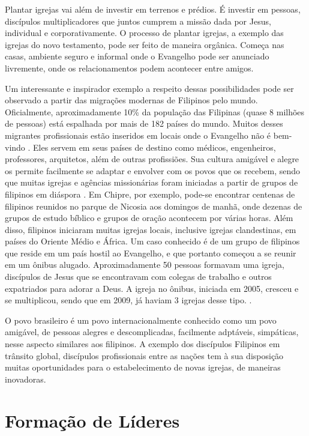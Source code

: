 \documentclass[12pt,openright,oneside,a4paper,
english,french,spanish,brazil]{abntex2}
\begin{document}
Plantar igrejas vai além de investir em terrenos e prédios. É investir em pessoas, discípulos multiplicadores que juntos cumprem a missão dada por Jesus, individual e corporativamente. O processo de plantar igrejas, a exemplo das igrejas do novo testamento, pode ser feito de maneira orgânica. Começa nas casas, ambiente seguro e informal onde o Evangelho pode ser anunciado livremente, onde os relacionamentos podem acontecer entre amigos.

Um interessante e inspirador exemplo a respeito dessas possibilidades pode ser observado a partir das migrações modernas de Filipinos pelo mundo. Oficialmente, aproximadamente 10\% da população das Filipinas (quase 8 milhões de pessoas) está espalhada por mais de 182 países do mundo. Muitos desses migrantes profissionais estão inseridos em locais onde o Evangelho não é bem-vindo \cite[p. 3]{wan2009filipino}. Eles servem em seus países de destino como médicos, engenheiros, professores, arquitetos, além de outras profissiões. Sua cultura amigável e alegre os permite facilmente se adaptar e envolver com os povos que os recebem, sendo que muitas igrejas e agências missionárias foram iniciadas a partir de grupos de filipinos em diáspora \cite[5,6]{wan2009filipino}. Em Chipre, por exemplo, pode-se encontrar centenas de filipinos reunidos no parque de Nicosia aos domingos de manhã, onde dezenas de grupos de estudo bíblico e grupos de oração acontecem por várias horas. Além disso, filipinos iniciaram muitas igrejas locais, inclusive igrejas clandestinas, em países do Oriente Médio e África. Um caso conhecido é de um grupo de filipinos que reside em um país hostil ao Evangelho, e que portanto começou a se reunir em um ônibus alugado. Aproximadamente 50 pessoas formavam uma igreja, discípulos de Jesus que se encontravam com colegas de trabalho e outros expatriados para adorar a Deus. A igreja no ônibus, iniciada em 2005, cresceu e se multiplicou, sendo que em 2009, já haviam 3 igrejas desse tipo. \cite[8]{wan2009filipino}.

O povo brasileiro é um povo internacionalmente conhecido como um povo amigável, de pessoas alegres e descomplicadas, facilmente adptáveis, simpáticas, nesse aspecto similares aos filipinos. A exemplo dos discípulos Filipinos em trânsito global, discípulos profissionais entre as nações tem à sua disposição muitas oportunidades para o estabelecimento de novas igrejas, de maneiras inovadoras. 

\section{Formação de Líderes}
\end{document}
